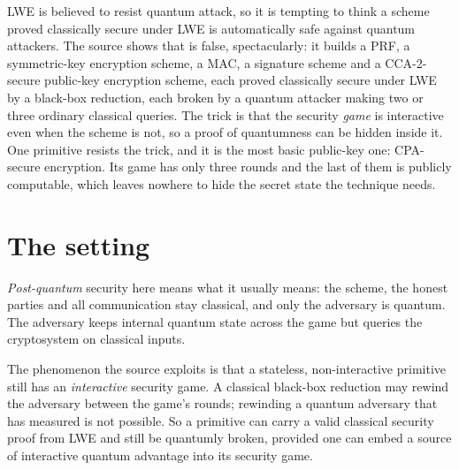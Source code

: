 \documentclass{aicr-conjecture}
\begin{document}

\vspace{0.4em}

\begin{informalconjecture}
LWE is believed to resist quantum attack, so it is tempting to think a
scheme proved classically secure under LWE is automatically safe against
quantum attackers. The source shows that is false, spectacularly: it
builds a PRF, a symmetric-key encryption scheme, a MAC, a signature
scheme and a CCA-2-secure public-key encryption scheme, each proved
classically secure under LWE by a black-box reduction, each broken by a
quantum attacker making two or three ordinary classical queries. The
trick is that the security \emph{game} is interactive even when the
scheme is not, so a proof of quantumness can be hidden inside it. One
primitive resists the trick, and it is the most basic public-key one:
CPA-secure encryption. Its game has only three rounds and the last of
them is publicly computable, which leaves nowhere to hide the secret
state the technique needs.
\end{informalconjecture}

\section{The setting}\label{sec:setting}

\emph{Post-quantum} security here means what it usually means: the
scheme, the honest parties and all communication stay classical, and only
the adversary is quantum. The adversary keeps internal quantum state
across the game but queries the cryptosystem on classical inputs.

The phenomenon the source exploits is that a stateless, non-interactive
primitive still has an \emph{interactive} security game. A classical
black-box reduction may rewind the adversary between the game's rounds;
rewinding a quantum adversary that has measured is not possible. So a
primitive can carry a valid classical security proof from LWE and still
be quantumly broken, provided one can embed a source of interactive
quantum advantage into its security game.
\end{document}
